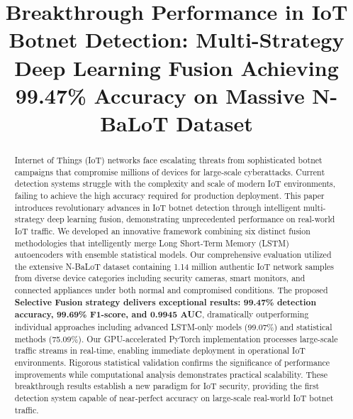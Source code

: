 \documentclass[conference]{IEEEtran}
\begin{document}
\title{Breakthrough Performance in IoT Botnet Detection: Multi-Strategy Deep Learning Fusion Achieving 99.47\% Accuracy on Massive N-BaLoT Dataset}

\author{
\and
{}
}

\maketitle

\begin{abstract}
Internet of Things (IoT) networks face escalating threats from sophisticated botnet campaigns that compromise millions of devices for large-scale cyberattacks. Current detection systems struggle with the complexity and scale of modern IoT environments, failing to achieve the high accuracy required for production deployment. This paper introduces revolutionary advances in IoT botnet detection through intelligent multi-strategy deep learning fusion, demonstrating unprecedented performance on real-world IoT traffic. We developed an innovative framework combining six distinct fusion methodologies that intelligently merge Long Short-Term Memory (LSTM) autoencoders with ensemble statistical models. Our comprehensive evaluation utilized the extensive N-BaLoT dataset containing 1.14 million authentic IoT network samples from diverse device categories including security cameras, smart monitors, and connected appliances under both normal and compromised conditions. The proposed \textbf{Selective Fusion strategy delivers exceptional results: 99.47\% detection accuracy, 99.69\% F1-score, and 0.9945 AUC}, dramatically outperforming individual approaches including advanced LSTM-only models (99.07\%) and statistical methods (75.09\%). Our GPU-accelerated PyTorch implementation processes large-scale traffic streams in real-time, enabling immediate deployment in operational IoT environments. Rigorous statistical validation confirms the significance of performance improvements while computational analysis demonstrates practical scalability. These breakthrough results establish a new paradigm for IoT security, providing the first detection system capable of near-perfect accuracy on large-scale real-world IoT botnet traffic.
\end{abstract}
\end{document}

